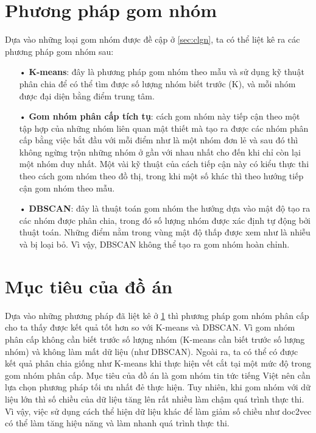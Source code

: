 \section{Phương pháp gom nhóm}
\label{sec:ppgn}
Dựa vào những loại gom nhóm được đề cập ở \ref{sec:clgn}, ta có thể liệt kê ra các phương pháp gom nhóm sau:
\begin{enumerate}
\item[•]\textbf{K-means}: đây là phương pháp gom nhóm theo mẫu và sử dụng kỹ thuật phân chia để có thể tìm được số lượng nhóm biết trước (K), và mỗi nhóm được đại diện bằng điểm trung tâm.
\item[•]\textbf{Gom nhóm phân cấp tích tụ}: cách gom nhóm này tiếp cận theo một tập hợp của những nhóm liên quan mật thiết mà tạo ra được các nhóm phân cấp bằng việc bắt đầu với mỗi điểm như là một nhóm đơn lẻ và sau đó thì không ngừng trộn những nhóm ở gần với nhau nhất cho đến khi chỉ còn lại một nhóm duy nhất.
Một vài kỹ thuật của cách tiếp cận này có kiểu thực thi theo cách gom nhóm theo đồ thị, trong khi một số khác thì theo hướng tiếp cận gom nhóm theo mẫu.
\item[•]\textbf{DBSCAN}: đây là thuật toán gom nhóm the hướng dựa vào mật độ tạo ra các nhóm được phân chia, trong đó số lượng nhóm được xác định tự động bởi thuật toán.
Những điểm nằm trong vùng mật độ thấp được xem như là nhiễu và bị loại bỏ.
Vì vậy, DBSCAN không thể tạo ra gom nhóm hoàn chỉnh.
\end{enumerate}

\section{Mục tiêu của đồ án}
Dựa vào những phương pháp đã liệt kê ở \ref{sec:ppgn} thì phương pháp gom nhóm phân cấp cho ta thấy được kết quả tốt hơn so với K-means và DBSCAN.
Vì gom nhóm phân cấp không cần biết trước số lượng nhóm (K-means cần biết trước số lượng nhóm) và không làm mất dữ liệu (như DBSCAN).
Ngoài ra, ta có thể có được kết quả phân chia giống như K-means khi thực hiện vết cắt tại một mức độ trong gom nhóm phân cấp.
Mục tiêu của đồ án là gom nhóm tin tức tiếng Việt nên cần lựa chọn phương pháp tối ưu nhất đẻ thực hiện.
Tuy nhiên, khi gom nhóm với dữ liệu lớn thì số chiều của dữ liệu tăng lên rất nhiều làm chậm quá trình thực thi.
Vì vậy, việc sử dụng cách thể hiện dữ liệu khác để làm giảm số chiều như doc2vec có thể làm tăng hiệu năng và làm nhanh quá trình thực thi.
